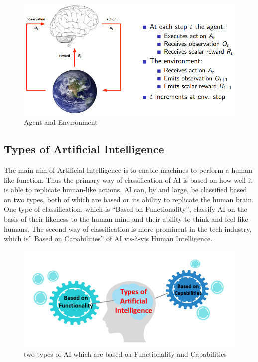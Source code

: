 \begin{figure}[H]
\centering
\includegraphics[scale=0.618]{pix/agent_n_env.png}
\caption{Agent and Environment}
\end{figure}


\subsection{Types of Artificial Intelligence}

The main aim of Artificial Intelligence is to enable machines to perform a human-like 
function. Thus the primary way of classification of AI is based on how well it is able 
to replicate human-like actions. AI can, by and large, be classified based on two 
types, both of which are based on its ability to replicate the human brain. One type 
of classification, which is “Based on Functionality”, classify AI on the basis of their 
likeness to the human mind and their ability to think and feel like humans. The second 
way of classification is more prominent in the tech industry, which is” Based on 
Capabilities” of AI vis-à-vis Human Intelligence.

\begin{figure}[H]
\centering
\includegraphics[scale=0.618]{pix/basics/Types-of-AI.png}
\caption{two types of AI which are based on Functionality and Capabilities}
\end{figure}


